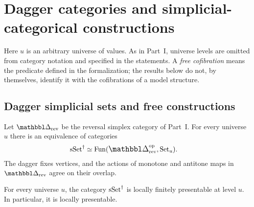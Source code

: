\section{Dagger categories and simplicial-categorical constructions}

Here $u$ is an arbitrary universe of values.
As in Part~I, universe levels are omitted from category notation and specified in the statements.
A \emph{free cofibration} means the predicate defined in the formalization;
the results below do not, by themselves, identify it with the cofibrations of a model structure.

\subsection{Dagger simplicial sets and free constructions}

\begin{resultblock}
\begin{theorem}
Let $\prism_{\rev}$ be the reversal simplex category of Part~I.
For every universe $u$ there is an equivalence of categories
\begin{align}
  \sSet^{\dag}
    &\simeq \Fun(\prism_{\rev}^{\myop},\Set_u).
\end{align}
The dagger fixes vertices, and the actions of monotone and antitone maps in $\prism_{\rev}$ agree on their overlap.
\end{theorem}
\end{resultblock}

\begin{resultblock}
\begin{theorem}
For every universe $u$, the category $\mathrm{sSet}^{\dag}$ is locally finitely presentable at level $u$.
In particular, it is locally presentable.
\end{theorem}
\end{resultblock}

